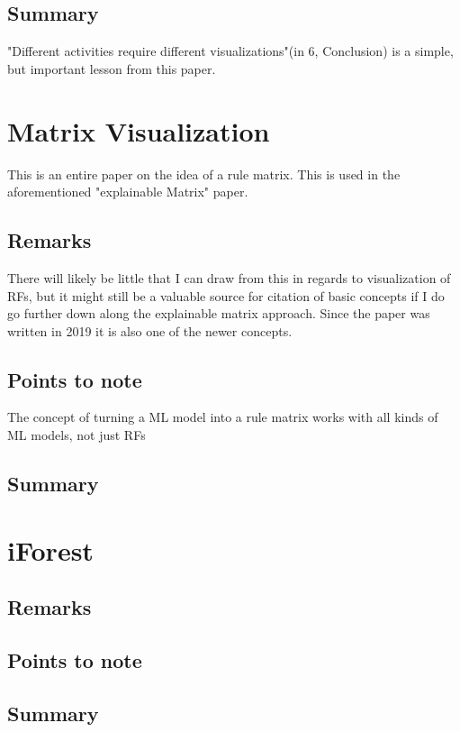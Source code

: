 \documentclass[a4paper, 12pt]{article}
\begin{document}
\subsection{Summary}
"Different activities require different visualizations"(in 6, Conclusion) is a simple, but important lesson from
this paper.

\section{Matrix Visualization}
This \cite{ming2018rulematrix} is an entire paper on the idea of a rule matrix. This is used in the aforementioned
"explainable Matrix" paper.
\subsection{Remarks}
There will likely be little that I can draw from this in regards to visualization of RFs, but it might still be a
valuable source for citation of basic concepts if I do go further down along the explainable matrix approach.
Since the paper was written in 2019 it is also one of the newer concepts.
\subsection{Points to note}
\begin{description}[font=$\bullet$~\normalfont]
        \item[Not specific to RFs]The concept of turning a ML model into a rule matrix works with all kinds of ML
        models, not just RFs
        \item[] 
\end{description}
\subsection{Summary}

\section{iForest}
\cite{zhao2018iforest}

\subsection{Remarks}
\subsection{Points to note}
\subsection{Summary}

\clearpage


\end{document}
